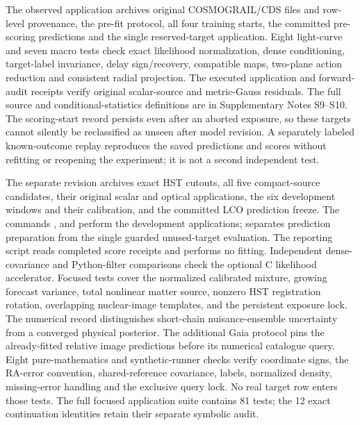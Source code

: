 The observed application archives original COSMOGRAIL/CDS files and
row-level provenance, the pre-fit protocol, all four training starts,
the committed pre-scoring predictions and the single reserved-target
application. Eight light-curve and seven macro tests check exact
likelihood normalization, dense conditioning, target-label invariance,
delay sign/recovery, compatible maps, two-plane action reduction and
consistent radial projection. The executed application and forward-audit
receipts verify original scalar-source and metric-Gauss residuals.
The full source and conditional-statistics
definitions are in Supplementary Notes S9--S10. The scoring-start record
persists even after an aborted exposure, so these targets cannot silently
be reclassified as unseen after model revision. A separately labeled known-outcome replay reproduces the saved predictions and scores without refitting or reopening the experiment; it is not a second independent test.

The separate revision archives exact HST cutouts, all five compact-source
candidates, their original scalar and optical applications, the six
development windows and their calibration, and the committed LCO prediction
freeze. The commands ,
 and
 perform the development
applications;  separates
prediction preparation from the single guarded unused-target evaluation.
The reporting script reads completed score receipts and performs no fitting.
Independent dense-covariance and Python-filter comparisons check the optional
C likelihood accelerator. Focused tests cover the normalized calibrated
mixture, growing forecast variance, total nonlinear matter source,
nonzero HST registration rotation, overlapping nuclear-image templates,
and the persistent exposure lock. The numerical record distinguishes
short-chain nuisance-ensemble uncertainty from a converged physical posterior.
The additional Gaia protocol pins the already-fitted relative image
predictions before its numerical catalogue query. Eight pure-mathematics
and synthetic-runner checks verify coordinate signs, the RA-error convention,
shared-reference covariance, labels, normalized density, missing-error
handling and the exclusive query lock. No real target row enters those tests.
The full focused application suite contains 81 tests; the 12 exact
continuation identities retain their separate symbolic audit.

